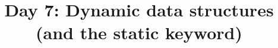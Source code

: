 \documentclass{article}
\begin{document}
\title{Day 7: Dynamic data structures (and the static keyword)}
\date{}
\maketitle


\end{document}
